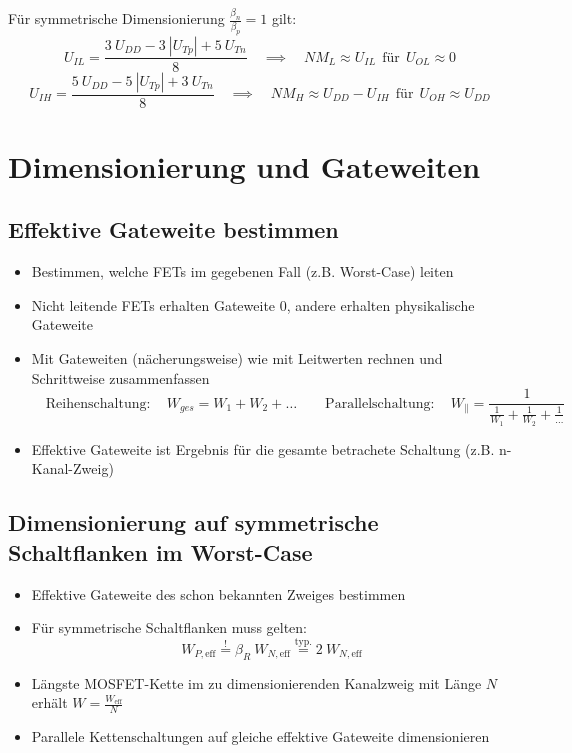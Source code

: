 \documentclass[a4paper,11pt]{article}
\begin{document}
Für symmetrische Dimensionierung $\frac{\beta_n}{\beta_p} = 1$ gilt:
\[
	U_{IL} = \frac{3 ~ U_{DD} - 3 ~ |U_{Tp}| + 5 ~ U_{Tn}}{8} \quad \implies \quad NM_L \approx U_{IL} ~~ \text{für} ~~ U_{OL} \approx 0
\]
\[
	U_{IH} = \frac{5 ~ U_{DD} - 5 ~ |U_{Tp}| + 3 ~ U_{Tn}}{8} \quad \implies \quad NM_H \approx U_{DD} - U_{IH} ~~ \text{für} ~~ U_{OH} \approx U_{DD}
\]

\section*{Dimensionierung und Gateweiten}
\subsection*{Effektive Gateweite bestimmen}
\begin{itemize}
	\item Bestimmen, welche FETs im gegebenen Fall (z.B. Worst-Case) leiten
	\item Nicht leitende FETs erhalten Gateweite 0, andere erhalten physikalische Gateweite
	\item Mit Gateweiten (nächerungsweise) wie mit Leitwerten rechnen und Schrittweise zusammenfassen
	\[
		\boxed{\quad \mathrm{Reihenschaltung:} \quad W_{ges} = W_1 + W_2 + \ldots \qquad \mathrm{Parallelschaltung:} \quad W_{\parallel} = \frac{1}{\frac{1}{W_1} + \frac{1}{W_2} + \frac{1}{\ldots}} \quad}
	\]
	\item Effektive Gateweite ist Ergebnis für die gesamte betrachete Schaltung (z.B. n-Kanal-Zweig)
\end{itemize}

\subsection*{Dimensionierung auf symmetrische Schaltflanken im Worst-Case}
\begin{itemize}
\item Effektive Gateweite des schon bekannten Zweiges bestimmen
\item Für symmetrische Schaltflanken muss gelten:
\[
\boxed{\quad W_{P, \mathrm{eff}} \overset{!}{=} \beta_R ~ W_{N, \mathrm{eff}} \overset{\mathrm{typ}.}{=} 2 ~ W_{N, \mathrm{eff}} \quad}
\]
\item Längste MOSFET-Kette im zu dimensionierenden Kanalzweig mit Länge $N$ erhält $W = \frac{W_{\mathrm{eff}}}{N}$
\item Parallele Kettenschaltungen auf gleiche effektive Gateweite dimensionieren
\end{itemize}
\end{document}
